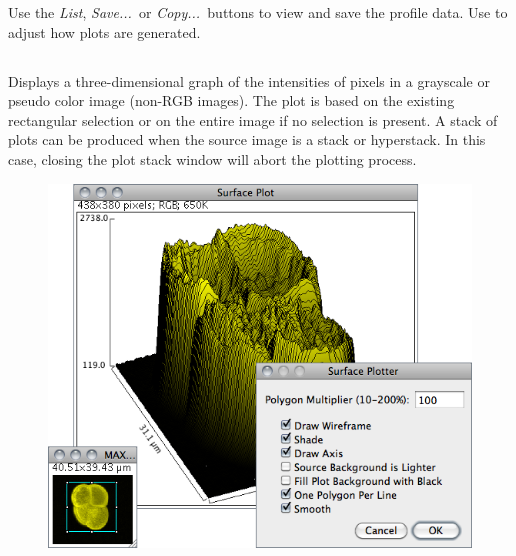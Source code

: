 Use the \emph{List},\emph{ Save...\ }or \emph{Copy...\ }buttons
to view and save the profile data. Use 
to adjust how plots are generated.




\subsection{\protect{}\label{sub:Surface-Plot...}}

Displays a three-dimensional graph of the intensities of pixels in
a grayscale or pseudo color image (non-RGB images). The plot is based
on the existing rectangular selection or on the entire image if no
selection is present.
A stack of plots can be produced when the source image is a stack
or hyperstack. In this case, closing the plot stack window will abort
the plotting process.
\begin{figure}[h]
\noindent \centering{}\includegraphics[scale=0.5]{images/SurfacePlot}
\end{figure}

